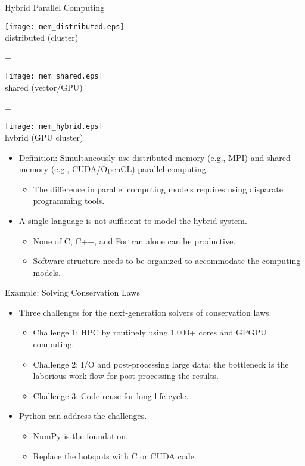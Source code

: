 \documentclass[dvips,xcolor=pst]{beamer}
\begin{document}
\begin{frame}{
%
Hybrid Parallel Computing
%
}
\begin{minipage}[c]{\textwidth}\centering
\parbox{0.3\textwidth}{\centering
\texttt{[image: mem\_distributed.eps]} \\ distributed
(cluster)}
+ 
\parbox{0.3\textwidth}{\centering 
\texttt{[image: mem\_shared.eps]} \\ shared (vector/GPU)}
= 
\parbox{0.3\textwidth}{\centering
\texttt{[image: mem\_hybrid.eps]} \\ hybrid (GPU cluster)}
\end{minipage}
\begin{itemize}
  \item Definition: Simultaneously use distributed-memory (e.g., MPI) and
  shared-memory (e.g., CUDA/OpenCL) parallel computing.
  \begin{itemize}
    \item The difference in parallel computing models requires using disparate
    programming tools.
  \end{itemize}
  \item A single language is not sufficient to model the hybrid system.
  \begin{itemize}
    \item None of C, C++, and Fortran alone can be productive.
    \item Software structure needs to be organized to accommodate the computing
    models.
  \end{itemize}
\end{itemize}
\end{frame}

\begin{frame}{
%
Example: Solving Conservation Laws
%
} \large
\begin{itemize}
  \item Three challenges for the next-generation solvers of conservation laws.
  \begin{itemize} \large
    \item Challenge 1: HPC by routinely using 1,000+ cores and GPGPU computing.
    \item Challenge 2: I/O and post-processing large data; the bottleneck is
    the laborious work flow for post-processing the results.
    \item Challenge 3: Code reuse for long life cycle.
  \end{itemize}
  \item Python can address the challenges.
  \begin{itemize} \large
    \item NumPy is the foundation.
    \item Replace the hotspots with C or CUDA code.
  \end{itemize}
\end{itemize}
\end{frame}
\end{document}
